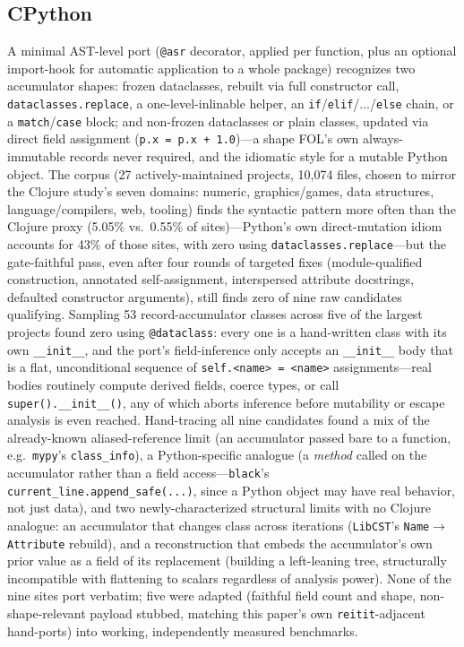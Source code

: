 \documentclass[sigplan,screen,review,anonymous]{acmart}
\begin{document}
\subsection{CPython}

A minimal AST-level port (\texttt{@asr} decorator, applied per function,
plus an optional import-hook for automatic application to a whole
package) recognizes two accumulator shapes: frozen dataclasses,
rebuilt via full constructor call, \texttt{dataclasses.replace}, a
one-level-inlinable helper, an \texttt{if}/\texttt{elif}/.../\texttt{else}
chain, or a \texttt{match}/\texttt{case} block; and non-frozen
dataclasses or plain classes, updated via direct field assignment
(\texttt{p.x = p.x + 1.0})---a shape FOL's own always-immutable records
never required, and the idiomatic style for a mutable Python object.
The corpus (27 actively-maintained projects, 10{,}074 files, chosen to
mirror the Clojure study's seven domains: numeric, graphics/games, data
structures, language/compilers, web, tooling) finds the syntactic
pattern more often than the Clojure proxy (5.05\% vs.\ 0.55\% of
sites)---Python's own direct-mutation idiom accounts for 43\% of those
sites, with zero using \texttt{dataclasses.replace}---but the
gate-faithful pass, even after four rounds of targeted fixes
(module-qualified construction, annotated self-assignment, interspersed
attribute docstrings, defaulted constructor arguments), still finds
zero of nine raw candidates qualifying. Sampling 53 record-accumulator
classes across five of the largest projects found zero using
\texttt{@dataclass}: every one is a hand-written class with its own
\texttt{\_\_init\_\_}, and the port's field-inference only accepts an
\texttt{\_\_init\_\_} body that is a flat, unconditional sequence of
\texttt{self.<name> = <name>} assignments---real bodies routinely
compute derived fields, coerce types, or call \texttt{super().\_\_init\_\_()},
any of which aborts inference before mutability or escape analysis is
even reached. Hand-tracing all nine candidates found a mix of the
already-known aliased-reference limit (an accumulator passed bare to a
function, e.g.\ \texttt{mypy}'s \texttt{class\_info}), a
Python-specific analogue (a \emph{method} called on the accumulator
rather than a field access---\texttt{black}'s
\texttt{current\_line.append\_safe(...)}, since a Python object may
have real behavior, not just data), and two newly-characterized
structural limits with no Clojure analogue: an accumulator that changes
class across iterations (\texttt{LibCST}'s \texttt{Name}$\to$\texttt{Attribute}
rebuild), and a reconstruction that embeds the accumulator's own prior
value as a field of its replacement (building a left-leaning tree,
structurally incompatible with flattening to scalars regardless of
analysis power). None of the nine sites port verbatim; five were
adapted (faithful field count and shape, non-shape-relevant payload
stubbed, matching this paper's own \texttt{reitit}-adjacent hand-ports)
into working, independently measured benchmarks.
\end{document}
